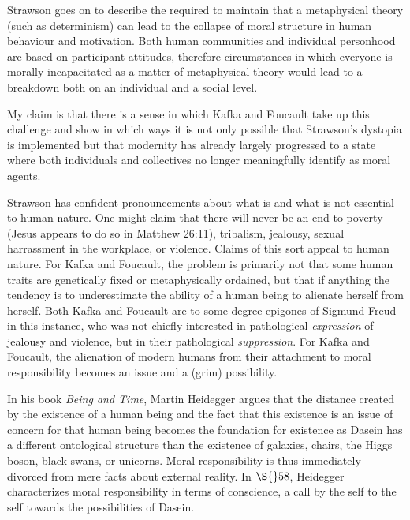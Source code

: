 \documentclass[11pt]{article}
\begin{document}
Strawson goes on to describe the 
required to maintain that a metaphysical theory (such as determinism)
can lead to the collapse of moral structure in human behaviour and
motivation. Both human communities and individual personhood are based
on participant attitudes, therefore circumstances in which everyone is
morally incapacitated as a matter of metaphysical theory would lead to
a breakdown both on an individual and a social level.

My claim is that there is a sense in which Kafka and Foucault take up
this challenge and show in which ways it is not only possible that
Strawson's dystopia is implemented but that modernity has already
largely progressed to a state where both individuals and collectives
no longer meaningfully identify as moral agents.

Strawson has confident pronouncements about what is and what is not
essential to human nature.
One might claim that there will never be an end to poverty (Jesus
appears to do so in Matthew 26:11), tribalism, jealousy, sexual
harrassment in the workplace, or violence. Claims of this sort appeal
to human nature. For Kafka and Foucault, the problem is primarily not
that some human traits are genetically fixed or metaphysically
ordained, but that if anything the tendency is to underestimate the
ability of a human being to alienate herself from herself. Both Kafka
and Foucault are to some degree epigones of Sigmund Freud in this
instance, who was not chiefly interested in pathological
\emph{expression} of jealousy and violence, but in their pathological
\emph{suppression}. For Kafka and Foucault, the alienation of modern
humans from their attachment to moral responsibility becomes an issue
and a (grim) possibility.

In his book \emph{Being and Time}, Martin Heidegger argues that the
distance created by the existence of a human being and the fact that
this existence is an issue of concern for that human being becomes the
foundation for existence as  Dasein has a different
ontological structure than the existence of galaxies, chairs, the
Higgs boson, black swans, or unicorns. Moral responsibility is thus
immediately divorced from mere facts about external reality. In
$\S{}58$, Heidegger characterizes moral responsibility in terms of
conscience, a call by the self to the self towards the possibilities
of Dasein.
\end{document}
